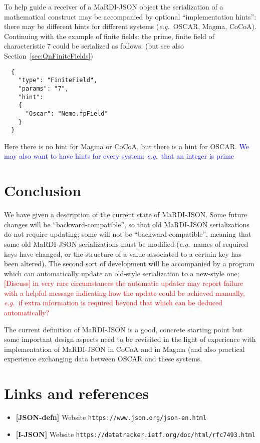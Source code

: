\documentclass{article}
\newcommand{\MaRDIJSON}{MaRDI-JSON}
\newcommand \eg {\textit{e.g.}}
\def\red#1{\textcolor{red}{#1}}
\def\blue#1{\textcolor{blue}{#1}}
\begin{document}
To help guide a receiver of a {\MaRDIJSON} object the serialization
of a mathematical construct may be accompanied by optional ``implementation hints'': there may be different hints for different systems (\eg~OSCAR, Magma, CoCoA).  Continuing with the example of finite fields: the prime, finite field of
characteristic $7$ could be serialized as follows: (but see also Section~\ref{sec:QnFiniteFields})
\begin{verbatim}
  {
    "type": "FiniteField",
    "params": "7",
    "hint":
    {
      "Oscar": "Nemo.fpField"
    }
  }
\end{verbatim}
Here there is no hint for Magma or CoCoA, but there is a hint for OSCAR.
\blue{We may also want to have hints for every system: \eg~that an integer
is prime}


\section{Conclusion}

We have given a description of the current state of {\MaRDIJSON}.
Some future changes will be ``backward-compatible'', so that old
{\MaRDIJSON} serializations do not require updating; some will not be
``backward-compatible'', meaning that some old {\MaRDIJSON}
serializations must be modified (\eg~names of required keys have
changed, or the structure of a value associated to a certain key has
been altered).  The second sort of development will be accompanied by
a program which can automatically update an old-style serialization to
a new-style one; \red{[Discuss] in very rare circumstances the automatic updater may
  report failure with a helpful message indicating how the update
  could be achieved manually, \eg~if extra information is required
  beyond that which can be deduced automatically?}

The current definition of {\MaRDIJSON} is a good, concrete starting point
but some important design aspects need to be revisited in the light of
experience with implementation of {\MaRDIJSON} in CoCoA and in Magma
(and also practical experience exchanging data between OSCAR and these
systems.

\goodbreak

\section{Links and references}

\begin{itemize}
\item \textbf{[JSON-defn]}  Website \texttt{https://www.json.org/json-en.html}
\item \textbf{[I-JSON]}  Website \texttt{https://datatracker.ietf.org/doc/html/rfc7493.html}
\end{itemize}
\end{document}
